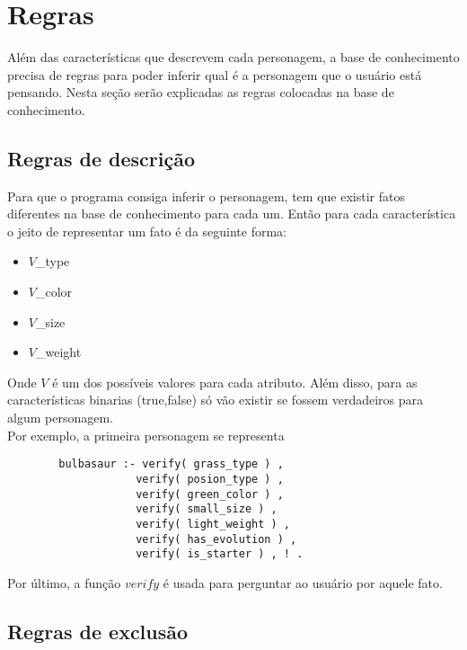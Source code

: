 \section{Regras}
\label{sec:rules}

Além das características que descrevem cada personagem, a base de conhecimento precisa de regras para poder inferir qual é a personagem que o usuário está pensando. Nesta seção serão explicadas as regras colocadas na base de conhecimento.

\subsection{Regras de descrição}
\label{subsec:description}
Para que o programa consiga inferir o personagem, tem que existir fatos diferentes na base de conhecimento para cada um. Então para cada característica o jeito de representar um fato é da seguinte forma:
	\begin{itemize}
		\item $V$\_type
		\item $V$\_color
		\item $V$\_size
		\item $V$\_weight
	\end{itemize}
Onde $V$ é um dos possíveis valores para cada atributo. Além disso, para as características binarias (true,false) só vão existir se fossem verdadeiros para algum personagem.\\
Por exemplo, a primeira personagem se representa
	\begin{lstlisting}
		bulbasaur :- verify( grass_type ) ,
					verify( posion_type ) ,
					verify( green_color ) ,
					verify( small_size ) ,
					verify( light_weight ) ,
					verify( has_evolution ) ,
					verify( is_starter ) , ! .
	\end{lstlisting}
Por último, a função ${verify}$ é usada para perguntar ao usuário por aquele fato.

\subsection{Regras de exclusão}
\label{subsec:exclusion}

